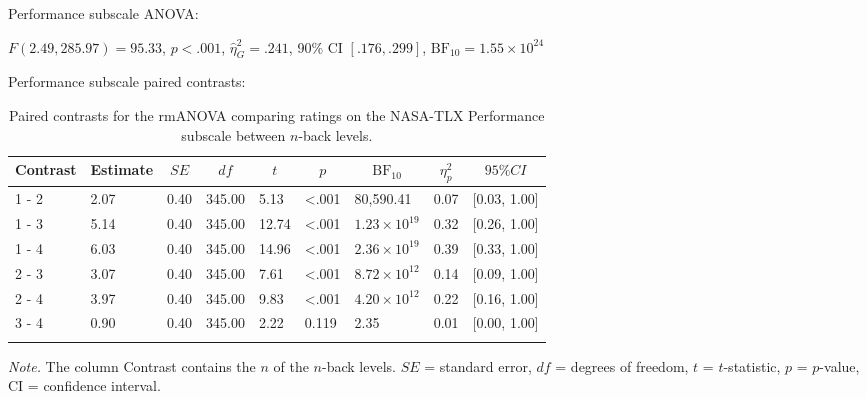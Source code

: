 \documentclass[
  man,floatsintext]{apa6}
\begin{document}
\newpage

Performance subscale ANOVA:

\(F(2.49, 285.97) = 95.33\), \(p < .001\), \(\hat{\eta}^2_G = .241\), 90\% CI \([.176, .299]\), \(\mathrm{BF}_{\textrm{10}} = 1.55 \times 10^{24}\)

Performance subscale paired contrasts:

\begin{table}[H]

\begin{center}
\begin{threeparttable}

\caption{\label{tab:unnamed-chunk-6}Paired contrasts for the rmANOVA comparing ratings on the NASA-TLX Performance subscale between $n$-back levels.}

\begin{tabular}{lllllllll}
\toprule
Contrast & \multicolumn{1}{c}{Estimate} & \multicolumn{1}{c}{$SE$} & \multicolumn{1}{c}{$df$} & \multicolumn{1}{c}{$t$} & \multicolumn{1}{c}{$p$} & \multicolumn{1}{c}{$\mathrm{BF}_{\textrm{10}}$} & \multicolumn{1}{c}{$\eta_{p}^{2}$} & \multicolumn{1}{c}{$95\% CI$}\\
\midrule
1 - 2 & 2.07 & 0.40 & 345.00 & 5.13 & <.001 & 80,590.41 & 0.07 & {}[0.03, 1.00]\\
1 - 3 & 5.14 & 0.40 & 345.00 & 12.74 & <.001 & $1.23 \times 10^{19}$ & 0.32 & {}[0.26, 1.00]\\
1 - 4 & 6.03 & 0.40 & 345.00 & 14.96 & <.001 & $2.36 \times 10^{19}$ & 0.39 & {}[0.33, 1.00]\\
2 - 3 & 3.07 & 0.40 & 345.00 & 7.61 & <.001 & $8.72 \times 10^{12}$ & 0.14 & {}[0.09, 1.00]\\
2 - 4 & 3.97 & 0.40 & 345.00 & 9.83 & <.001 & $4.20 \times 10^{12}$ & 0.22 & {}[0.16, 1.00]\\
3 - 4 & 0.90 & 0.40 & 345.00 & 2.22 & 0.119 & 2.35 & 0.01 & {}[0.00, 1.00]\\
\bottomrule
\addlinespace
\end{tabular}

\begin{tablenotes}[para]
\normalsize{\textit{Note.} The column Contrast contains the $n$ of the $n$-back levels. $SE$ = standard error, $df$ = degrees of freedom, $t$ = $t$-statistic, $p$ = $p$-value, CI = confidence interval.}
\end{tablenotes}

\end{threeparttable}
\end{center}

\end{table}
\end{document}
